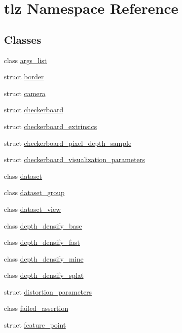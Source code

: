 \hypertarget{namespacetlz}{}\section{tlz Namespace Reference}
\label{namespacetlz}
\subsection*{Classes}
\begin{DoxyCompactItemize}
\item 
class \hyperlink{classtlz_1_1args__list}{args\+\_\+list}
\item 
struct \hyperlink{structtlz_1_1border}{border}
\item 
struct \hyperlink{structtlz_1_1camera}{camera}
\item 
struct \hyperlink{structtlz_1_1checkerboard}{checkerboard}
\item 
struct \hyperlink{structtlz_1_1checkerboard__extrinsics}{checkerboard\+\_\+extrinsics}
\item 
struct \hyperlink{structtlz_1_1checkerboard__pixel__depth__sample}{checkerboard\+\_\+pixel\+\_\+depth\+\_\+sample}
\item 
struct \hyperlink{structtlz_1_1checkerboard__visualization__parameters}{checkerboard\+\_\+visualization\+\_\+parameters}
\item 
class \hyperlink{classtlz_1_1dataset}{dataset}
\item 
class \hyperlink{classtlz_1_1dataset__group}{dataset\+\_\+group}
\item 
class \hyperlink{classtlz_1_1dataset__view}{dataset\+\_\+view}
\item 
class \hyperlink{classtlz_1_1depth__densify__base}{depth\+\_\+densify\+\_\+base}
\item 
class \hyperlink{classtlz_1_1depth__densify__fast}{depth\+\_\+densify\+\_\+fast}
\item 
class \hyperlink{classtlz_1_1depth__densify__mine}{depth\+\_\+densify\+\_\+mine}
\item 
class \hyperlink{classtlz_1_1depth__densify__splat}{depth\+\_\+densify\+\_\+splat}
\item 
struct \hyperlink{structtlz_1_1distortion__parameters}{distortion\+\_\+parameters}
\item 
class \hyperlink{classtlz_1_1failed__assertion}{failed\+\_\+assertion}
\item 
struct \hyperlink{structtlz_1_1feature__point}{feature\+\_\+point}
\item 

\end{DoxyCompactItemize}
